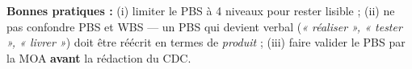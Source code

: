 \documentclass[11pt,a4paper,oneside]{report}
\begin{document}
\begin{reco}
\textbf{Bonnes pratiques :} (i) limiter le PBS à 4 niveaux pour rester lisible ; (ii) ne pas confondre PBS et WBS --- un PBS qui devient verbal (\textit{« réaliser », « tester », « livrer »}) doit être réécrit en termes de \textit{produit} ; (iii) faire valider le PBS par la MOA \textbf{avant} la rédaction du CDC.
\end{reco}
\end{document}
